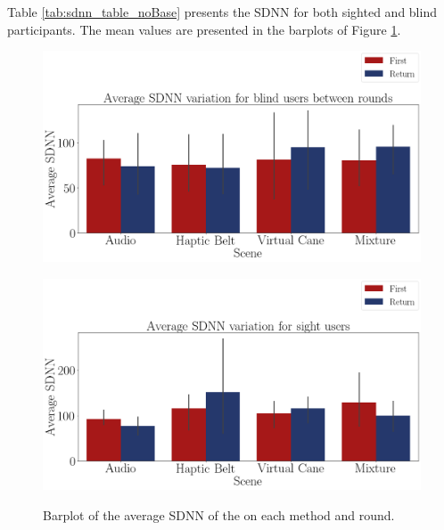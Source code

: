 
Table \ref{tab:sdnn_table_noBase} presents the SDNN for both sighted and blind participants. The mean values are presented in the barplots of Figure \ref{fig:barplot_ecg_sdnn_4_scene_blind_sight}.



\begin{figure}[!htb]
    \centering
    \begin{minipage}{\textwidth}
        \centering
        \includegraphics[width = 0.8\linewidth]{Resultados/ECG/Figuras/png/barplot_ecg_sdnn_4_scene_blind.png}
        \label{fig:barplot_ecg_sdnn_4_scene_blind}
    \end{minipage}
    \begin{minipage}{\textwidth}
        \centering
        \includegraphics[width = 0.8\linewidth]{Resultados/ECG/Figuras/png/barplot_ecg_sdnn_4_scene_sight.png}
        \label{fig:barplot_ecg_sdnn_4_scene_sight}
    \end{minipage}
    \caption{Barplot of the average SDNN of the on each method and round.}
    \label{fig:barplot_ecg_sdnn_4_scene_blind_sight}
\end{figure}

